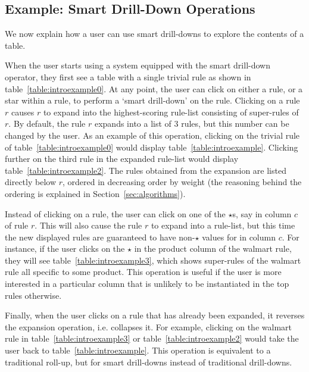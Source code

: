 \subsection{Example: Smart Drill-Down Operations}
\label{sec:interface}
We now explain how a user can use smart drill-downs to explore the contents of a table. 

When the user starts using a system equipped with
the smart drill-down operator, they first see a table with a single trivial rule as shown in table~\ref{table:introexample0}. At any point, the user can click on either a rule, or a star within a rule, to perform a `smart drill-down' on the rule. Clicking on a rule $r$ causes $r$ to expand into the highest-scoring rule-list consisting of super-rules of $r$. By default, the rule $r$ expands into a list of $3$ rules, but this number can be changed by the user. As an example of this operation, clicking on the trivial rule of table~\ref{table:introexample0} would display table~\ref{table:introexample}. Clicking further on the third rule in the expanded rule-list would display table~\ref{table:introexample2}. The rules obtained from the expansion are listed directly below $r$, ordered in decreasing order by weight (the reasoning behind the ordering is explained in Section~\ref{sec:algorithms}).

Instead of clicking on a rule, the user can click on one of the $\star$s, say in column $c$ of rule $r$. This will also cause the rule $r$ to expand into a rule-list, but this time the new displayed rules are guaranteed to have non-$\star$ values for in column $c$. For instance, if the user clicks on the $\star$ in the product column of the walmart rule, they will see table~\ref{table:introexample3}, which shows super-rules of the walmart rule all specific to some product. This operation is useful if the user is more interested in a particular column that is unlikely to be instantiated in the top rules otherwise. 

Finally, when the user clicks on a rule that has already been expanded, it reverses the expansion operation, i.e. collapses it. For example, clicking on the walmart rule in table~\ref{table:introexample3} or table~\ref{table:introexample2} would take the user back to table~\ref{table:introexample}. This operation is equivalent to a traditional
roll-up, but for smart drill-downs instead of traditional drill-downs.
	
